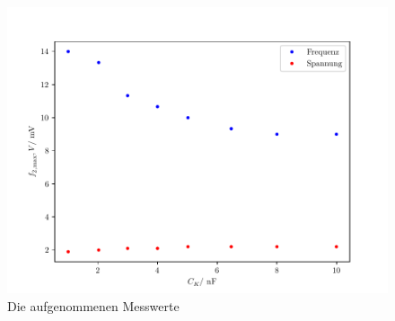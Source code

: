 \begin{figure}
  \centering
  \includegraphics{freq2.pdf}
  \caption{Die aufgenommenen Messwerte}
  \label{fig:freq2}
\end{figure}






